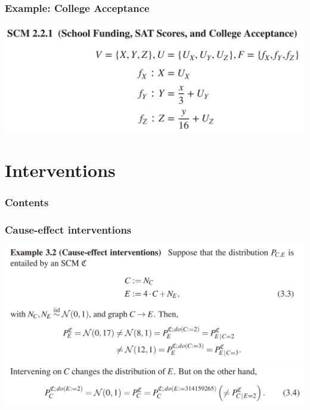 \documentclass{beamer}
\begin{document}
\begin{frame}
    \frametitle{Example: College Acceptance} 
    \includegraphics[scale=0.6]{fig2.png}
\end{frame}


\section{Interventions}

\begin{frame}
    \frametitle{Contents}
    \tableofcontents[currentsection]
\end{frame}

\begin{frame}
    \frametitle{Cause-effect interventions}
    \includegraphics[scale=0.6]{fig9.png}
    \includegraphics[scale=0.6]{fig10.png}
\end{frame}
\end{document}
